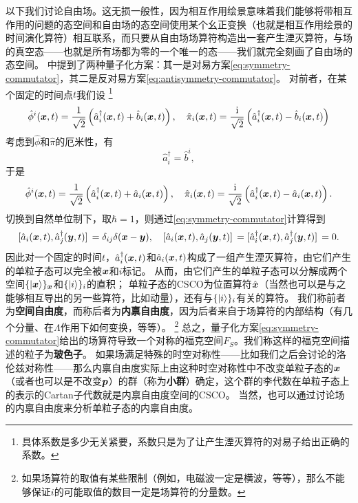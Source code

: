 \documentclass[hyperref, UTF8, a4paper]{ctexart}
\newcommand*{\ii}{\mathrm{i}}
\renewcommand{\autoref}{\prettyref}
\begin{document}
以下我们讨论自由场。这无损一般性，因为相互作用绘景意味着我们能够将带相互作用的问题的态空间和自由场的态空间使用某个幺正变换（也就是相互作用绘景的时间演化算符）相互联系，而只要从自由场场算符构造出一套产生湮灭算符，与场的真空态——也就是所有场都为零的一个唯一的态——我们就完全刻画了自由场的态空间。
\autoref{sec:canonical-quantization}中提到了两种量子化方案：其一是对易方案\eqref{eq:symmetry-commutator}，其二是反对易方案\eqref{eq:antisymmetry-commutator}。
对前者，在某个固定的时间点$t$我们设
%
\footnote{具体系数是多少无关紧要，系数只是为了让产生湮灭算符的对易子给出正确的系数。}
\[
    \hat{\phi}^i(\vb*{x}, t) = \frac{1}{\sqrt{2}} \left( \hat{a}_i^\dagger (\vb*{x}, t) + \hat{b}_i(\vb*{x}, t) \right), \quad 
    \hat{\pi}_i(\vb*{x}, t) = \frac{\ii}{\sqrt{2}} \left( \hat{a}_i^\dagger (\vb*{x}, t) - \hat{b}_i (\vb*{x}, t) \right)
\]
考虑到$\hat{\phi}$和$\hat{\pi}$的厄米性，有
\[
    \hat{a}_i^\dagger = \hat{b}^i,
\]
于是
\begin{equation}
    \hat{\phi}^i(\vb*{x}, t) = \frac{1}{\sqrt{2}} \left( \hat{a}_i^\dagger (\vb*{x}, t) + \hat{a}_i(\vb*{x}, t) \right), \quad 
    \hat{\pi}_i(\vb*{x}, t) = \frac{\ii}{\sqrt{2}} \left( \hat{a}_i^\dagger (\vb*{x}, t) - \hat{a}_i (\vb*{x}, t) \right).
\end{equation}
切换到自然单位制下，取$\hbar=1$，则通过\eqref{eq:symmetry-commutator}计算得到
\begin{equation}
    \comm*{\hat{a}_i(\vb*{x}, t)}{\hat{a}_j^\dagger (\vb*{y}, t)} = \delta_{ij} \delta (\vb*{x} - \vb*{y}), \quad \comm*{\hat{a}_i(\vb*{x}, t)}{\hat{a}_j(\vb*{y}, t)} = \comm*{\hat{a}_i^\dagger (\vb*{x}, t)}{\hat{a}_j^\dagger (\vb*{y}, t)} = 0.
    \label{eq:ca-op-from-field}
\end{equation}
因此对一个固定的时间$t$，$\hat{a}_i^\dagger(\vb*{x}, t)$和$\hat{a}_i (\vb*{x}, t)$构成了一组产生湮灭算符，由它们产生的单粒子态可以完全被$\vb*{x}$和$i$标记。
从而，由它们产生的单粒子态可以分解成两个空间$\{\ket{\vb*{x}}\}_{\vb*{x}}$和$\{\ket{i}\}_i$的直积；
单粒子态的CSCO为位置算符$\hat{\vb*{x}}$（当然也可以是与之能够相互导出的另一些算符，比如动量），还有与$\{\ket{i}\}_i$有关的算符。
我们称前者为\textbf{空间自由度}，而称后者为\textbf{内禀自由度}，因为后者来自于场算符的内部结构（有几个分量、在$\Lambda$作用下如何变换，等等）。%
\footnote{如果场算符的取值有某些限制（例如，电磁波一定是横波，等等），那么不能够保证$i$的可能取值的数目一定是场算符的分量数。}
总之，量子化方案\eqref{eq:symmetry-commutator}给出的场算符导致一个对称的福克空间$F_S$。我们称这样的福克空间描述的粒子为\textbf{玻色子}。
如果场满足特殊的时空对称性——比如我们之后会讨论的洛伦兹对称性——那么内禀自由度实际上由这种时空对称性中不改变单粒子态的$\vb*{x}$（或者也可以是不改变$\vb*{p}$）的群（称为\textbf{小群}）确定，这个群的李代数在单粒子态上的表示的Cartan子代数就是内禀自由度空间的CSCO。
当然，也可以通过讨论场的内禀自由度来分析单粒子态的内禀自由度。
\end{document}
